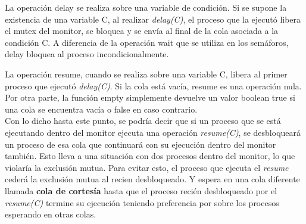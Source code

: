 La operación delay se realiza sobre una variable de condición. Si se supone la existencia de una variable C, al realizar \textit{delay(C)}, el proceso que la ejecutó libera el mutex del monitor, se bloquea y se envía al final de la cola asociada a la condición C. A diferencia de la operación wait que se utiliza en los semáforos, delay bloquea al proceso incondicionalmente.\\

\par La operación resume, cuando se realiza sobre una variable C, libera al primer proceso que ejecutó \textit{delay(C)}. Si la cola está vacía, resume es una operación nula. Por otra parte, la función empty simplemente devuelve un valor boolean true si una cola se encuentra vacía o false en caso contrario.\\

Con lo dicho hasta este punto, se podría decir que si un proceso que se está ejecutando dentro del monitor ejecuta una operación \textit{resume(C)}, se desbloqueará un proceso de esa cola que continuará con su ejecución dentro del monitor también. Esto lleva a una situación con dos procesos dentro del monitor, lo que violaría la exclusión mutua. Para evitar esto, el proceso que ejecuta el \textit{resume} cederá la exclusión mutua al recien desbloqueado. Y espera en una cola diferente llamada \textbf{cola de cortesía} hasta que el proceso recién desbloqueado por el \textit{resume(C)} termine su ejecución teniendo preferencia por sobre los procesos esperando en otras colas.


